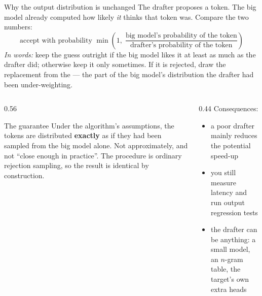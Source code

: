 \documentclass[aspectratio=169,10pt]{beamer}
\begin{document}
\begin{frame}[shrink=4]{Why the output distribution is unchanged}
  The drafter proposes a token. The big model already computed how likely
  \emph{it} thinks that token was. Compare the two numbers:
  \[
    \text{accept with probability }
    \min\!\left(1,\;
      \frac{\text{big model's probability of the token}}
           {\text{drafter's probability of the token}}\right)
  \]
  \emph{In words:} keep the guess outright if the big model likes it at least
  as much as the drafter did; otherwise keep it only sometimes. If it is
  rejected, draw the replacement from the  --- the part of the
  big model's distribution the drafter had been under-weighting.
  \vspace{0.2em}
  \begin{columns}[T]
    \begin{column}{0.56\textwidth}
      \begin{block}{The guarantee}
        \small
        Under the algorithm's assumptions, the tokens are distributed
        \textbf{exactly} as if they had been sampled from the big model alone.
        \vspace{0.3em}
        Not approximately, and not ``close enough in practice''. The procedure
        is ordinary rejection sampling, so the result is identical by
        construction.
      \end{block}
    \end{column}
    \begin{column}{0.44\textwidth}
      \small
      Consequences:
      \begin{itemize}
        \item a poor drafter mainly reduces the potential speed-up
        \item you still measure latency and run output regression tests
        \item the drafter can be anything: a small model, an $n$-gram table,
          the target's own extra heads
      \end{itemize}
    \end{column}
  \end{columns}
\end{frame}
\end{document}
